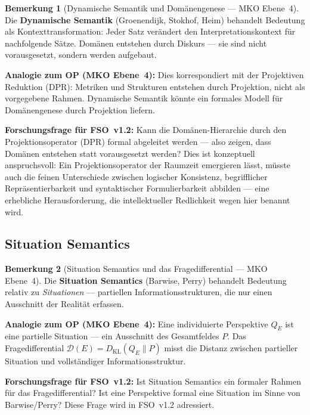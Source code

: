 \documentclass[11pt,a4paper]{article}
\theoremstyle{plain}
\theoremstyle{definition}
\newtheorem{remark}{Bemerkung}[section]
\begin{document}
\begin{remark}[Dynamische Semantik und Dom\"{a}nengenese --- MKO Ebene~4]
Die \textbf{Dynamische Semantik} (Groenendijk, Stokhof, Heim) behandelt Bedeutung
als Kontexttransformation: Jeder Satz ver\"{a}ndert den Interpretationskontext f\"{u}r
nachfolgende S\"{a}tze. Dom\"{a}nen entstehen durch Diskurs --- sie sind nicht
vorausgesetzt, sondern werden aufgebaut.

\textbf{Analogie zum OP (MKO Ebene~4):} Dies korrespondiert mit der Projektiven
Reduktion (DPR): Metriken und Strukturen entstehen durch Projektion, nicht als
vorgegebene Rahmen. Dynamische Semantik k\"{o}nnte ein formales Modell f\"{u}r
Dom\"{a}nengenese durch Projektion liefern.

\textbf{Forschungsfrage f\"{u}r FSO~v1.2:} Kann die Dom\"{a}nen-Hierarchie durch
den Projektionsoperator (DPR) formal abgeleitet werden --- also zeigen, dass Dom\"{a}nen
entstehen statt vorausgesetzt werden? Dies ist konzeptuell anspruchsvoll: Ein
Projektionsoperator der Raumzeit emergieren l\"{a}sst, m\"{u}sste auch die feinen
Unterschiede zwischen logischer Konsistenz, begrifflicher Repr\"{a}sentierbarkeit und
syntaktischer Formulierbarkeit abbilden --- eine erhebliche Herausforderung, die
intellektueller Redlichkeit wegen hier benannt wird.
\end{remark}

\subsection{Situation Semantics}

\begin{remark}[Situation Semantics und das Fragedifferential --- MKO Ebene~4]
Die \textbf{Situation Semantics} (Barwise, Perry) behandelt Bedeutung relativ zu
\emph{Situationen} --- partiellen Informationsstrukturen, die nur einen Ausschnitt
der Realit\"{a}t erfassen.

\textbf{Analogie zum OP (MKO Ebene~4):} Eine individuierte Perspektive $Q_E$ ist
eine partielle Situation --- ein Ausschnitt des Gesamtfeldes $P$. Das Fragedifferential
$\mathcal{D}(E) = D_{\mathrm{KL}}(Q_E \| P)$ misst die Distanz zwischen partieller
Situation und vollst\"{a}ndiger Informationsstruktur.

\textbf{Forschungsfrage f\"{u}r FSO~v1.2:} Ist Situation Semantics ein formaler
Rahmen f\"{u}r das Fragedifferential? Ist eine Perspektive formal eine Situation im
Sinne von Barwise/Perry? Diese Frage wird in FSO~v1.2 adressiert.
\end{remark}
\end{document}
